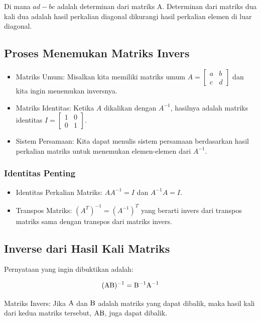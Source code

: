 \documentclass{article}
\begin{document}
Di mana \( ad - bc \) adalah determinan dari matriks A. Determinan dari matriks dua kali dua adalah hasil perkalian diagonal dikurangi hasil perkalian elemen di luar diagonal.

\subsection{Proses Menemukan Matriks Invers}
\begin{itemize}
    \item Matriks Umum: Misalkan kita memiliki matriks umum \( A = \begin{bmatrix} a & b \\ c & d \end{bmatrix} \) dan kita ingin menemukan inversnya.
    \item Matriks Identitas: Ketika \( A \) dikalikan dengan \( A^{-1} \), hasilnya adalah matriks identitas \( I = \begin{bmatrix} 1 & 0 \\ 0 & 1 \end{bmatrix} \).
    \item Sistem Persamaan: Kita dapat menulis sistem persamaan berdasarkan hasil perkalian matriks untuk menemukan elemen-elemen dari \( A^{-1} \).
\end{itemize}

\subsubsection{Identitas Penting}
\begin{itemize}
    \item Identitas Perkalian Matriks: \( A A^{-1} = I \) dan \( A^{-1} A = I \).
    \item Transpos Matriks: \( (A^T)^{-1} = (A^{-1})^T \) yang berarti invers dari transpos matriks sama dengan transpos dari matriks invers.
\end{itemize}

\subsection{Inverse dari Hasil Kali Matriks}
Pernyataan yang ingin dibuktikan adalah:

\[ ({\rm AB})^{-1} = {\rm B}^{-1}{\rm A}^{-1} \]

Matriks Invers: Jika \( \rm A \) dan \( \rm B \) adalah matriks yang dapat dibalik, maka hasil kali dari kedua matriks tersebut, \( \rm AB \), juga dapat dibalik.
\end{document}
